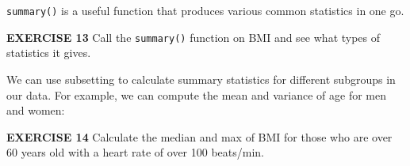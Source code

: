 \documentclass[
]{article}
\newenvironment{Shaded}{\begin{snugshade}}{\end{snugshade}}
\newcommand{\CommentTok}[1]{\textcolor[rgb]{0.56,0.35,0.01}{\textit{#1}}}
\newcommand{\DataTypeTok}[1]{\textcolor[rgb]{0.13,0.29,0.53}{#1}}
\newcommand{\DecValTok}[1]{\textcolor[rgb]{0.00,0.00,0.81}{#1}}
\newcommand{\KeywordTok}[1]{\textcolor[rgb]{0.13,0.29,0.53}{\textbf{#1}}}
\newcommand{\NormalTok}[1]{#1}
\newcommand{\OperatorTok}[1]{\textcolor[rgb]{0.81,0.36,0.00}{\textbf{#1}}}
\newcommand{\OtherTok}[1]{\textcolor[rgb]{0.56,0.35,0.01}{#1}}
\newcommand{\StringTok}[1]{\textcolor[rgb]{0.31,0.60,0.02}{#1}}
\begin{document}
\texttt{summary()} is a useful function that produces various common
statistics in one go.

\textbf{EXERCISE 13} Call the \texttt{summary()} function on BMI and see
what types of statistics it gives.

\begin{Shaded}
\end{Shaded}

We can use subsetting to calculate summary statistics for different
subgroups in our data. For example, we can compute the mean and variance
of age for men and women:

\begin{Shaded}
\end{Shaded}

\textbf{EXERCISE 14} Calculate the median and max of BMI for those who
are over 60 years old with a heart rate of over 100 beats/min.

\begin{Shaded}
\end{Shaded}
\end{document}
